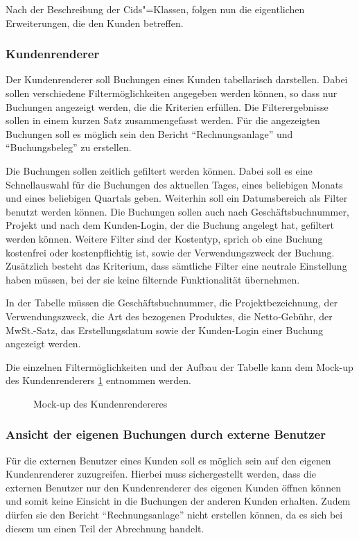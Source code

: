 Nach der Beschreibung der Cids"=Klassen, folgen nun die eigentlichen Erweiterungen, die den Kunden betreffen.

\subsubsection{Kundenrenderer} \label{subsubsec:kundenrenderer}
Der Kundenrenderer soll Buchungen eines Kunden tabellarisch darstellen.
Dabei sollen verschiedene Filtermöglichkeiten angegeben werden können, so dass nur Buchungen angezeigt werden, die die Kriterien erfüllen.
Die Filterergebnisse sollen in einem kurzen Satz zusammengefasst werden.
Für die angezeigten Buchungen soll es möglich sein den Bericht \enquote{Rechnungsanlage} und \enquote{Buchungsbeleg} zu erstellen.

Die Buchungen sollen zeitlich gefiltert werden können.
Dabei soll es eine Schnellauswahl für die Buchungen des aktuellen Tages, eines beliebigen Monats und eines beliebigen Quartals geben.
Weiterhin soll ein Datumsbereich als Filter benutzt werden können.
Die Buchungen sollen auch nach Geschäftsbuchnummer, Projekt und nach dem Kunden-Login, der die Buchung angelegt hat, gefiltert werden können.
Weitere Filter sind der Kostentyp, sprich ob eine Buchung kostenfrei oder kostenpflichtig ist, sowie der Verwendungszweck der Buchung.
Zusätzlich besteht das Kriterium, dass sämtliche Filter eine neutrale Einstellung haben müssen, bei der sie keine filternde Funktionalität übernehmen.

In der Tabelle müssen die Geschäftsbuchnummer, die Projektbezeichnung, der Verwendungszweck, die Art des bezogenen Produktes, die Netto-Gebühr, der MwSt.-Satz, das Erstellungsdatum sowie der Kunden-Login einer Buchung angezeigt werden.

Die einzelnen Filtermöglichkeiten und der Aufbau der Tabelle kann dem Mock-up des Kundenrenderers \ref{fig:mockup-kunderenderer} entnommen werden.

\begin{figure}[htb]
	\centering
	\caption{Mock-up des Kundenrendereres}
	\label{fig:mockup-kunderenderer}
\end{figure}

\subsubsection{Ansicht der eigenen Buchungen durch externe Benutzer} \label{subsubsec:ansicht_externe_benutzer}
Für die externen Benutzer eines Kunden soll es möglich sein auf den eigenen Kundenrenderer zuzugreifen.
Hierbei muss sichergestellt werden, dass die externen Benutzer nur den Kundenrenderer des eigenen Kunden öffnen können und somit keine Einsicht in die Buchungen der anderen Kunden erhalten. 
Zudem dürfen sie den Bericht \enquote{Rechnungsanlage} nicht erstellen können, da es sich bei diesem um einen Teil der Abrechnung handelt.

